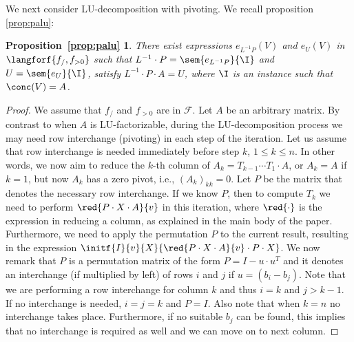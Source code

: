 \newtheorem*{PALU}{Proposition~\ref{prop:palu}}
We next consider LU-decomposition with pivoting. We recall proposition \ref{prop:palu}:

\begin{PALU}
  There exist expressions $e_{L^{-1}P}(V)$ and $e_U(V)$ in $\langforf{f_/,f_{>0}}$  such that
  $L^{-1}\cdot P=\sem{e_{L^{-1}P}}{\I}$ and $U=\sem{e_U}{\I}$, satisfy $L^{-1}\cdot P\cdot A=U$, where $\I$ is an instance such that $\conc(V)=A$. 
\end{PALU}
\begin{proof}
We assume that $f_{/}$ and $f_{>0}$ are in $\mathcal{F}$. Let $A$ be an arbitrary matrix.
%
By contrast to when $A$ is LU-factorizable, during the LU-decomposition process we may need row interchange (pivoting) in each step of the iteration. Let us assume that row interchange is needed immediately before 
step $k$, $1\leq k\leq n$. In other words, we now aim to reduce the $k$-th column of $A_k=T_{k-1}\cdots T_1\cdot A$, 
or $A_k=A$ if $k=1$, but now $A_k$ has a zero pivot, i.e., $(A_{k})_{kk}=0$. 
Let $P$ be the matrix that denotes the necessary row interchange. If we know
$P$, then 
to compute $T_k$ we need to perform $\red{P\cdot X\cdot A}{v}$ in this iteration,
where $\red{\cdot}$ is the expression in \langfor reducing a column, as explained in the main body of the paper.
Furthermore, we need to apply the permutation $P$ to the current result, resulting in the 
expression $\initf{I}{v}{X}{\red{P\cdot X\cdot A}{v}\cdot P\cdot X}$. We now remark that
$P$ is a permutation matrix of the  form $P = I - u\cdot u^T$ and it denotes an interchange (if multiplied by left) of rows $i$ and $j$ if $u=(b_{i}-b_{j})$. Note that we are performing a row interchange for column $k$ and thus $i=k$ and $j>k-1$. If no interchange is needed, $i=j=k$ and $P=I$.
Also note that when $k=n$ no interchange takes place. Furthermore, if no suitable $b_j$ can
be found, this implies that no interchange is required as well and we can move on to next column.


\end{proof}
